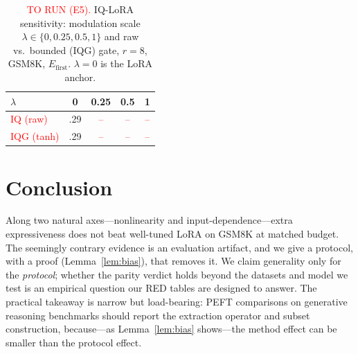 \documentclass[preprint,11pt]{elsarticle}
\begin{document}
\begin{table}[t]\centering
\caption{\textcolor{red}{TO RUN (E5).} IQ-LoRA sensitivity: modulation scale $\lambda\in\{0,0.25,0.5,1\}$ and raw vs.\
bounded (IQG) gate, $r{=}8$, GSM8K, $E_{\text{first}}$. $\lambda{=}0$ is the LoRA anchor.}
\label{tab:ablate-iq}
\begin{tabular}{lcccc}
\toprule
$\lambda$ & 0 & 0.25 & 0.5 & 1\\
\midrule
\textcolor{red}{IQ (raw)} & .29 & \textcolor{red}{--} & \textcolor{red}{--} & \textcolor{red}{--}\\
\textcolor{red}{IQG (tanh)} & .29 & \textcolor{red}{--} & \textcolor{red}{--} & \textcolor{red}{--}\\
\bottomrule
\end{tabular}
\end{table}

\section{Conclusion}
Along two natural axes---nonlinearity and input-dependence---extra expressiveness does not beat well-tuned LoRA on GSM8K at
matched budget. The seemingly contrary evidence is an evaluation artifact, and we give a protocol, with a proof
(Lemma~\ref{lem:bias}), that removes it. We claim generality only for the \emph{protocol}; whether the parity verdict holds
beyond the datasets and model we test is an empirical question our RED tables are designed to answer. The practical
takeaway is narrow but load-bearing: PEFT comparisons on generative reasoning benchmarks should report the extraction
operator and subset construction, because---as Lemma~\ref{lem:bias} shows---the method effect can be smaller than the
protocol effect.


%
\end{document}
